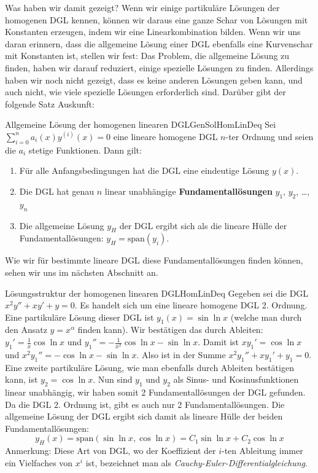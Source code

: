 Was haben wir damit gezeigt? Wenn wir einige partikuläre Lösungen der homogenen DGL kennen, können wir daraus eine ganze Schar von Lösungen mit Konstanten erzeugen, indem wir eine Linearkombination bilden. Wenn wir uns daran erinnern, dass die allgemeine Lösung einer DGL ebenfalls eine Kurvenschar mit Konstanten ist, stellen wir fest: Das Problem, die allgemeine Lösung zu finden, haben wir darauf reduziert, einige spezielle Lösungen zu finden. Allerdings haben wir noch nicht gezeigt, dass es keine anderen Lösungen geben kann, und auch nicht, wie viele spezielle Lösungen erforderlich sind. Darüber gibt der folgende Satz Auskunft:

\begin{statement}{Allgemeine Lösung der homogenen linearen DGL}{GenSolHomLinDeq}
    Sei $\sum\limits_{i=0}^n a_i(x) y^{(i)}(x) = 0$ eine lineare homogene DGL $n$-ter Ordnung und seien die $a_i$ stetige Funktionen. Dann gilt:
    \begin{enumerate}
        \item Für alle Anfangsbedingungen hat die DGL eine eindeutige Lösung $y(x)$.
        \item Die DGL hat genau $n$ linear unabhängige \textbf{Fundamentallösungen} $y_1$, $y_2$, \dots, $y_n$
        \item Die allgemeine Lösung $y_H$ der DGL ergibt sich als die lineare Hülle der Fundamentallösungen: $y_H = \text{span}(y_i)$.
    \end{enumerate}
\end{statement}

Wie wir für bestimmte lineare DGL diese Fundamentallösungen finden können, sehen wir uns im nächsten Abschnitt an.

\begin{example}{Lösungsstruktur der homogenen linearen DGL}{HomLinDeq}
    Gegeben sei die DGL $x^2y''+xy'+y=0$. Es handelt sich um eine lineare homogene DGL 2. Ordnung. Eine partikuläre Lösung dieser DGL ist $y_1(x) = \sin\ln x$ (welche man durch den Ansatz $y=x^\alpha$ finden kann). Wir bestätigen das durch Ableiten: $y_1' = \frac{1}{x}\cos\ln x$ und $y_1''= -\frac{1}{x^2} \cos\ln x -\sin\ln x$. Damit ist $xy_1'=\cos\ln x$ und $x^2y_1'' = -\cos\ln x-\sin\ln x$. Also ist in der Summe $x^2y_1''+xy_1'+y_1 = 0$. Eine zweite partikuläre Lösung, wie man ebenfalls durch Ableiten bestätigen kann, ist $y_2 = \cos\ln x$.  Nun sind $y_1$ und $y_2$ als Sinus- und Kosinusfunktionen linear unabhängig, wir haben somit 2 Fundamentallösungen der DGL gefunden. Da die DGL 2. Ordnung ist, gibt es auch nur 2 Fundamentallösungen. Die allgemeine Lösung der DGL ergibt sich damit als lineare Hülle der beiden Fundamentallösungen:
    $$
        y_H(x) = \text{span}(\sin\ln x, \cos\ln x) = C_1 \sin\ln x + C_2 \cos\ln x
    $$
    Anmerkung: Diese Art von DGL, wo der Koeffizient der $i$-ten Ableitung immer ein Vielfaches von $x^i$ ist, bezeichnet man als \emph{Cauchy-Euler-Differentialgleichung}.
\end{example}


